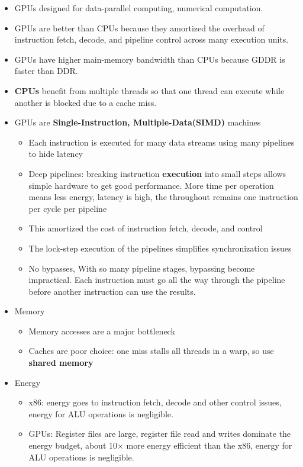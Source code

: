 \documentclass[../main.tex]{subfiles}
\begin{document}
\begin{itemize}
	\item GPUs designed for data-parallel computing, numerical computation.
	\item GPUs are better than CPUs because they amortized the overhead of instruction fetch, decode, and pipeline control across many execution units.
	\item GPUs have higher main-memory bandwidth than CPUs because GDDR is faster than DDR.
	\item \textbf{CPUs} benefit from multiple threads so that one thread can execute while another is blocked due to a cache miss.
	\item GPUs are \textbf{Single-Instruction, Multiple-Data(SIMD)} machines
	      \begin{itemize}
		      \item Each instruction is executed for many data streams using many pipelines to hide latency
		      \item Deep pipelines: breaking instruction \textbf{execution} into small steps allows simple hardware to get good performance. More time per operation means less energy, latency is high, the throughout remains one instruction per cycle per pipeline
		      \item This amortized the cost of instruction fetch, decode, and control
		      \item The lock-step execution of the pipelines simplifies synchronization issues
		      \item No bypasses, With so many pipeline stages, bypassing become impractical. Each instruction must go all the way through the pipeline before another instruction can use the results.
	      \end{itemize}
	\item Memory
	      \begin{itemize}
		      \item Memory accesses are a major bottleneck
		      \item Caches are poor choice: one miss stalls all threads in a warp, so use \textbf{shared memory}
	      \end{itemize}
	\item Energy
	      \begin{itemize}
		      \item x86: energy goes to instruction fetch, decode and other control issues, energy for ALU operations is negligible.
		      \item GPUs: Register files are large, register file read and writes dominate the energy budget, about 10\(\times\) more energy efficient than the x86, energy for ALU operations is negligible.

\end{itemize}
\end{itemize}
\end{document}
